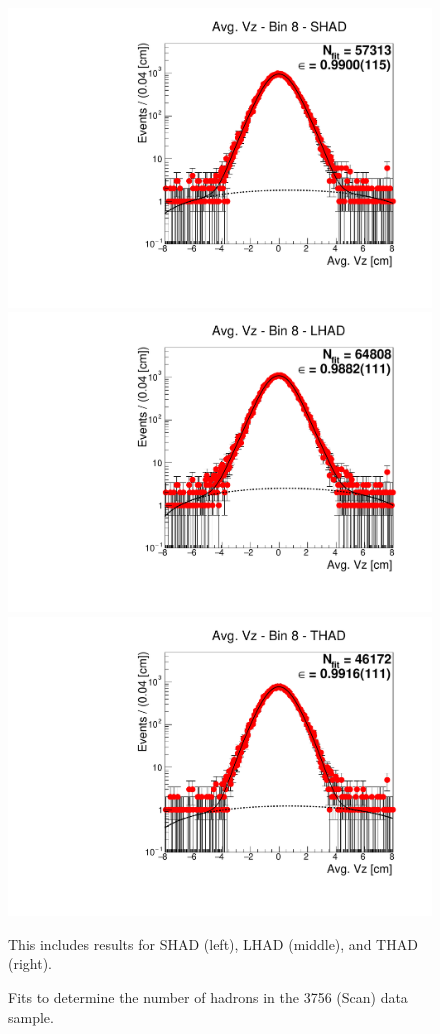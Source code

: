 \begin{figure}[H]
\centering
\includegraphics[scale=0.25]{figures/plots/nonDDbar_fit_results/scan/fit_scan_08_data_SHAD.pdf}
\hspace{-0.5cm}
\includegraphics[scale=0.25]{figures/plots/nonDDbar_fit_results/scan/fit_scan_08_data_LHAD.pdf}
\hspace{-0.5cm}
\includegraphics[scale=0.25]{figures/plots/nonDDbar_fit_results/scan/fit_scan_08_data_THAD.pdf}
\caption{Fits to determine the number of hadrons in the 3756 (Scan) data sample.}
{This includes results for SHAD (left), LHAD (middle), and THAD (right).}
\label{fig:hadron_fits_scan_08}
\end{figure}

